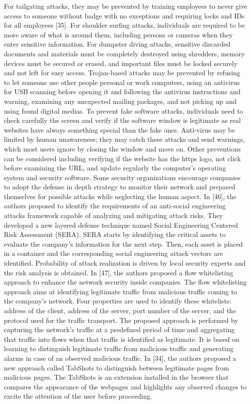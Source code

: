 For tailgating attacks, they may be prevented by training employees to never give access to someone without badge with no exceptions and requiring locks and IDs for all employees [35]. For shoulder surfing attacks, individuals are required to be more aware of what is around them, including persons or cameras when they enter sensitive information. For dumpster diving attacks, sensitive discarded documents and materials must be completely destroyed using shredders, memory devices must be secured or erased, and important files must be locked securely and not left for easy access.
Trojan-based attacks may be prevented by refusing to let someone use other people personal or work computers, using an antivirus for USB scanning before opening it and following the antivirus instructions and warning, examining any unexpected mailing packages, and not picking up and using found digital medias. To prevent fake software attacks, individuals need to check carefully the screen and verify if the software window is legitimate as real websites have always something special than the fake ones. Anti-virus may be limited by human unawareness; they may catch these attacks and send warnings, which most users ignore by closing the window and move on. Other preventions can be considered including verifying if the website has the https logo, not click before examining the URL, and update regularly the computer’s operating system and security software.
Some security organizations encourage companies to adopt the defense in depth strategy to monitor their network and prepared themselves for possible attacks while neglecting the human aspect. In [46], the authors proposed to identify the requirements of an anti-social engineering attacks framework capable of analyzing and mitigating attack risks. They developed a new layered defense technique named Social Engineering Centered Risk Assessment (SERA). SERA starts by identifying the critical assets to evaluate the company’s information for the next step. Then, each asset is placed in a container and the corresponding social engineering attack vectors are identified. Probability of attack realization is driven by local security experts and the risk analysis is obtained.
In [47], the authors proposed a flow whitelisting approach to enhance the network security inside companies. The flow whitelisting approach aims at identifying legitimate traffic from malicious traffic coming to the company’s network. Four properties are used to identify these whitelists: address of the client, address of the server, port number of the server, and the protocol used for the traffic transport. The proposed approach is performed by capturing the network’s traffic at a predefined period of time and aggregating that traffic into flows when that traffic is identified as legitimate. It is based on learning to distinguish legitimate traffic from malicious traffic and generating alarms in case of an observed malicious traffic. In [34], the authors proposed a new approach called TabShots to distinguish between legitimate pages from malicious pages. The TabShots is an extension installed in the browser that compares the appearance of the webpages and highlights any observed changes to excite the attention of the user before proceeding.
